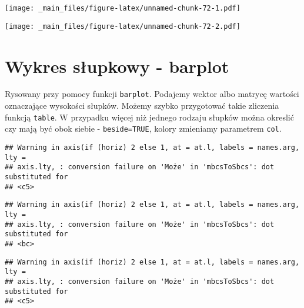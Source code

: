 \documentclass[
]{book}
\newenvironment{Shaded}{\begin{snugshade}}{\end{snugshade}}
\newcommand{\FunctionTok}[1]{\textcolor[rgb]{0.00,0.00,0.00}{#1}}
\newcommand{\NormalTok}[1]{#1}
\newcommand{\SpecialCharTok}[1]{\textcolor[rgb]{0.00,0.00,0.00}{#1}}
\begin{document}
\texttt{[image: \_main\_files/figure-latex/unnamed-chunk-72-1.pdf]}

\begin{Shaded}
\end{Shaded}

\texttt{[image: \_main\_files/figure-latex/unnamed-chunk-72-2.pdf]}

\hypertarget{wykres-sux142upkowy---barplot}{%
\section{Wykres słupkowy - barplot}\label{wykres-sux142upkowy---barplot}}

Rysowany przy pomocy funkcji \texttt{barplot}. Podajemy wektor albo matrycę wartości oznaczające wysokości słupków. Możemy szybko przygotować takie zliczenia funkcją \texttt{table}. W przypadku więcej niż jednego rodzaju słupków można okreslić czy mają być obok siebie - \texttt{beside=TRUE}, kolory zmieniamy parametrem \texttt{col}.

\begin{Shaded}
\end{Shaded}

\begin{verbatim}
## Warning in axis(if (horiz) 2 else 1, at = at.l, labels = names.arg, lty =
## axis.lty, : conversion failure on 'Może' in 'mbcsToSbcs': dot substituted for
## <c5>
\end{verbatim}

\begin{verbatim}
## Warning in axis(if (horiz) 2 else 1, at = at.l, labels = names.arg, lty =
## axis.lty, : conversion failure on 'Może' in 'mbcsToSbcs': dot substituted for
## <bc>
\end{verbatim}

\begin{verbatim}
## Warning in axis(if (horiz) 2 else 1, at = at.l, labels = names.arg, lty =
## axis.lty, : conversion failure on 'Może' in 'mbcsToSbcs': dot substituted for
## <c5>
\end{verbatim}
\end{document}
